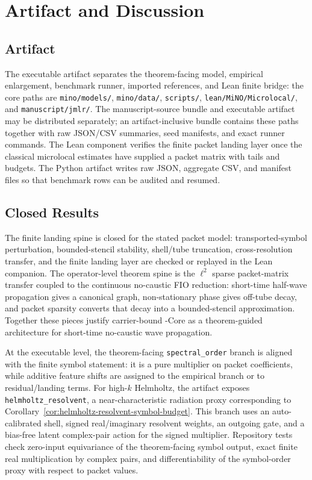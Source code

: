 \section{Artifact and Discussion}
\label{sec:artifact}

\subsection{Artifact}

The executable artifact separates the theorem-facing model, empirical enlargement, benchmark runner, imported references, and Lean finite bridge:
the core paths are \texttt{mino/models/}, \texttt{mino/data/}, \texttt{scripts/}, \texttt{lean/MiNO/Microlocal/}, and \texttt{manuscript/jmlr/}.
The manuscript-source bundle and executable artifact may be distributed separately; an artifact-inclusive bundle contains these paths together with raw JSON/CSV summaries, seed manifests, and exact runner commands.  The Lean component verifies the finite packet landing layer once the classical microlocal estimates have supplied a packet matrix with tails and budgets.  The Python artifact writes raw JSON, aggregate CSV, and manifest files so that benchmark rows can be audited and resumed.

\subsection{Closed Results}

The finite landing spine is closed for the stated packet model: transported-symbol perturbation, bounded-stencil stability, shell/tube truncation, cross-resolution transfer, and the finite landing layer are checked or replayed in the Lean companion.  The operator-level theorem spine is the $\ell^2$ sparse packet-matrix transfer coupled to the continuous no-caustic FIO reduction: short-time half-wave propagation gives a canonical graph, non-stationary phase gives off-tube decay, and packet sparsity converts that decay into a bounded-stencil approximation.  Together these pieces justify carrier-bound \MiNO-Core as a theorem-guided architecture for short-time no-caustic wave propagation.

At the executable level, the theorem-facing \texttt{spectral\_order} branch is aligned with the finite symbol statement: it is a pure multiplier on packet coefficients, while additive feature shifts are assigned to the empirical branch or to residual/landing terms.  For high-$k$ Helmholtz, the artifact exposes \texttt{helmholtz\_resolvent}, a near-characteristic radiation proxy corresponding to Corollary~\ref{cor:helmholtz-resolvent-symbol-budget}.  This branch uses an auto-calibrated shell, signed real/imaginary resolvent weights, an outgoing gate, and a bias-free latent complex-pair action for the signed multiplier.  Repository tests check zero-input equivariance of the theorem-facing symbol output, exact finite real multiplication by complex pairs, and differentiability of the symbol-order proxy with respect to packet values.

